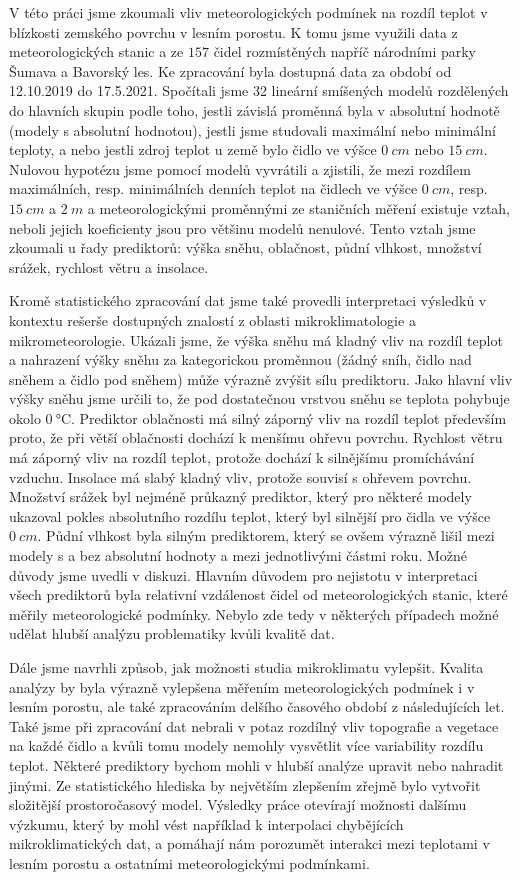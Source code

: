 V této práci jsme zkoumali vliv meteorologických podmínek na rozdíl teplot v blízkosti zemského povrchu v lesním porostu. K tomu jsme využili data z meteorologických stanic a ze $157$ čidel rozmístěných napříč národními parky Šumava a Bavorský les. Ke zpracování byla dostupná data za období od 12.10.2019 do 17.5.2021. Spočítali jsme 32 lineární smíšených modelů rozdělených do hlavních skupin podle toho, jestli závislá proměnná byla v absolutní hodnotě (modely s absolutní hodnotou), jestli jsme studovali maximální nebo minimální teploty, a nebo jestli zdroj teplot u země bylo čidlo ve výšce $\SI{0}{cm}$ nebo $\SI{15}{cm}$. Nulovou hypotézu jsme pomocí modelů vyvrátili a zjistili, že mezi rozdílem maximálních, resp. minimálních denních teplot na čidlech ve výšce $\SI{0}{cm}$, resp. $\SI{15}{cm}$ a $\SI{2}{m}$ a meteorologickými proměnnými ze staničních měření existuje vztah, neboli jejich koeficienty jsou pro většinu modelů nenulové. Tento vztah jsme zkoumali u řady prediktorů: výška sněhu, oblačnost, půdní vlhkost, množství srážek, rychlost větru a insolace.

Kromě statistického zpracování dat jsme také provedli interpretaci výsledků v kontextu rešerše dostupných znalostí z oblasti mikroklimatologie a mikrometeorologie. Ukázali jsme, že výška sněhu má kladný vliv na rozdíl teplot a nahrazení výšky sněhu za kategorickou proměnnou (žádný sníh, čidlo nad sněhem a čidlo pod sněhem) může výrazně zvýšit sílu prediktoru. Jako hlavní vliv výšky sněhu jsme určili to, že pod dostatečnou vrstvou sněhu se teplota pohybuje okolo $\SI{0}{\celsius}$. Prediktor oblačnosti má silný záporný vliv na rozdíl teplot především proto, že při větší oblačnosti dochází k menšímu ohřevu povrchu. Rychlost větru má záporný vliv na rozdíl teplot, protože dochází k silnějšímu promíchávání vzduchu. Insolace má slabý kladný vliv, protože souvisí s ohřevem povrchu. Množství srážek byl nejméně průkazný prediktor, který pro některé modely ukazoval pokles absolutního rozdílu teplot, který byl silnější pro čidla ve výšce $\SI{0}{cm}$. Půdní vlhkost byla silným prediktorem, který se ovšem výrazně lišil mezi modely s a bez absolutní hodnoty a mezi jednotlivými částmi roku. Možné důvody jsme uvedli v diskuzi. Hlavním důvodem pro nejistotu v interpretaci všech prediktorů byla relativní vzdálenost čidel od meteorologických stanic, které měřily meteorologické podmínky. Nebylo zde tedy v některých případech možné udělat hlubší analýzu problematiky kvůli kvalitě dat.

Dále jsme navrhli způsob, jak možnosti studia mikroklimatu vylepšit. Kvalita analýzy by byla výrazně vylepšena měřením meteorologických podmínek i v lesním porostu, ale také zpracováním delšího časového období z následujících let. Také jsme při zpracování dat nebrali v potaz rozdílný vliv topografie a vegetace na každé čidlo a kvůli tomu modely nemohly vysvětlit více variability rozdílu teplot. Některé prediktory bychom mohli v hlubší analýze upravit nebo nahradit jinými. Ze statistického hlediska by největším zlepšením zřejmě bylo vytvořit složitější prostoročasový model. Výsledky práce otevírají možnosti dalšímu výzkumu, který by mohl vést například k interpolaci chybějících mikroklimatických dat, a pomáhají nám porozumět interakci mezi teplotami v lesním porostu a ostatními meteorologickými podmínkami.
